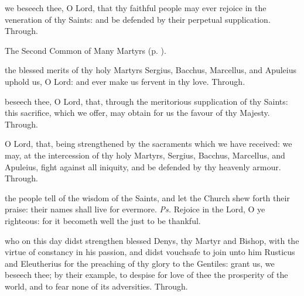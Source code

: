 \postcommunion\label{MarkRomePostcommunion}

\vspace{-0.15\baselineskip}

 we beseech thee, O Lord, that thy faithful people may ever rejoice in the veneration of thy Saints: and be defended by their perpetual supplication. Through.


\clearpage
{}

\begin{rubric}
	The Second Common of Many Martyrs (p. \pageref{CommonMartyrsII}).
\end{rubric}

\collect\label{SergiusCollect}
 the blessed merits of thy holy Martyrs Sergius, Bacchus, Marcellus, and Apuleius uphold us, O Lord: and ever make us fervent in thy love. Through.

\secret\label{SergiusSecret}
 beseech thee, O Lord, that, through the meritorious supplication of thy Saints: this sacrifice, which we offer, may obtain for us the favour of thy Majesty. Through.

\postcommunion\label{SergiusPostcommunion}
 O Lord, that, being strengthened by the sacraments which we have received: we may, at the intercession of thy holy Martyrs, Sergius, Bacchus, Marcellus, and Apuleius, fight against all iniquity, and be defended by thy heavenly armour. Through.



\introit
{} the people tell of the wisdom of the Saints, and let the Church shew forth their praise: their names shall live for evermore. \textit{Ps.} Rejoice in the Lord, O ye righteous: for it becometh well the just to be thankful.

\collect
{} who on this day didst strengthen blessed Denys, thy Martyr and Bishop, with the virtue of constancy in his passion, and didst vouchsafe to join unto him Rusticus and Eleutherius for the preaching of thy glory to the Gentiles: grant us, we beseech thee; by their example, to despise for love of thee the prosperity of the world, and to fear none of its adversities. Through.

